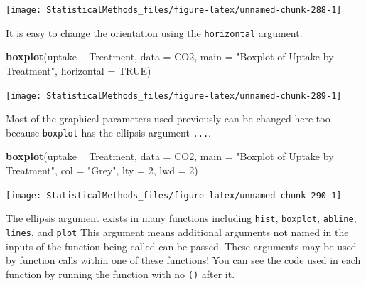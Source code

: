 \documentclass[
]{book}
\newenvironment{Shaded}{\begin{snugshade}}{\end{snugshade}}
\newcommand{\DataTypeTok}[1]{\textcolor[rgb]{0.13,0.29,0.53}{#1}}
\newcommand{\DecValTok}[1]{\textcolor[rgb]{0.00,0.00,0.81}{#1}}
\newcommand{\KeywordTok}[1]{\textcolor[rgb]{0.13,0.29,0.53}{\textbf{#1}}}
\newcommand{\NormalTok}[1]{#1}
\newcommand{\OperatorTok}[1]{\textcolor[rgb]{0.81,0.36,0.00}{\textbf{#1}}}
\newcommand{\OtherTok}[1]{\textcolor[rgb]{0.56,0.35,0.01}{#1}}
\newcommand{\StringTok}[1]{\textcolor[rgb]{0.31,0.60,0.02}{#1}}
\theoremstyle{definition}
\theoremstyle{definition}
\theoremstyle{definition}
\theoremstyle{remark}
\begin{document}
\begin{center}\texttt{[image: StatisticalMethods\_files/figure-latex/unnamed-chunk-288-1]} \end{center}

It is easy to change the orientation using the \texttt{horizontal} argument.

\begin{Shaded}
\begin{Highlighting}[]
\KeywordTok{boxplot}\NormalTok{(uptake }\OperatorTok{~}\StringTok{ }\NormalTok{Treatment, }\DataTypeTok{data =}\NormalTok{ CO2, }
        \DataTypeTok{main =} \StringTok{"Boxplot of Uptake by Treatment"}\NormalTok{, }\DataTypeTok{horizontal =} \OtherTok{TRUE}\NormalTok{)}
\end{Highlighting}
\end{Shaded}

\begin{center}\texttt{[image: StatisticalMethods\_files/figure-latex/unnamed-chunk-289-1]} \end{center}

Most of the graphical parameters used previously can be changed here too because \texttt{boxplot} has the ellipsis argument \texttt{...}.

\begin{Shaded}
\begin{Highlighting}[]
\KeywordTok{boxplot}\NormalTok{(uptake }\OperatorTok{~}\StringTok{ }\NormalTok{Treatment, }\DataTypeTok{data =}\NormalTok{ CO2, }
        \DataTypeTok{main =} \StringTok{"Boxplot of Uptake by Treatment"}\NormalTok{, }\DataTypeTok{col =} \StringTok{"Grey"}\NormalTok{, }\DataTypeTok{lty =} \DecValTok{2}\NormalTok{, }\DataTypeTok{lwd =} \DecValTok{2}\NormalTok{)}
\end{Highlighting}
\end{Shaded}

\begin{center}\texttt{[image: StatisticalMethods\_files/figure-latex/unnamed-chunk-290-1]} \end{center}

The ellipsis argument exists in many functions including \texttt{hist}, \texttt{boxplot}, \texttt{abline}, \texttt{lines}, and \texttt{plot} This argument means additional arguments not named in the inputs of the function being called can be passed. These arguments may be used by function calls within one of these functions! You can see the code used in each function by running the function with no \texttt{()} after it.
\end{document}
